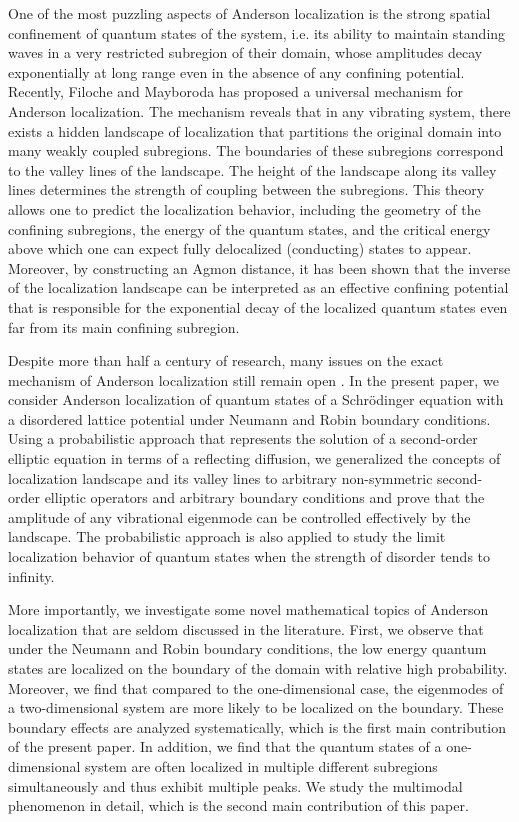\documentclass[a4paper,11pt]{article}
\begin{document}
One of the most puzzling aspects of Anderson localization is the strong spatial confinement of quantum states of the system, i.e. its ability to maintain standing waves in a very restricted subregion of their domain, whose amplitudes decay exponentially at long range even in the absence of any confining potential. Recently, Filoche and Mayboroda \cite{filoche2012universal} has proposed a universal mechanism for Anderson localization. The mechanism reveals that in any vibrating system, there exists a hidden landscape of localization that partitions the original domain into many weakly coupled subregions. The boundaries of these subregions correspond to the valley lines of the landscape. The height of the landscape along its valley lines determines the strength of coupling between the subregions. This theory allows one to predict the localization behavior, including the geometry of the confining subregions, the energy of the quantum states, and the critical energy above which one can expect fully delocalized (conducting) states to appear. Moreover, by constructing an Agmon distance, it has been shown \cite{arnold2016effective, arnold2019localization, arnold2019computing} that the inverse of the localization landscape can be interpreted as an effective confining potential that is responsible for the exponential decay of the localized quantum states even far from its main confining subregion.

Despite more than half a century of research, many issues on the exact mechanism of Anderson localization still remain open \cite{abrahams2001metallic, evers2008anderson, lagendijk2009fifty}. In the present paper, we consider Anderson localization of quantum states of a Schr\"{o}dinger equation with a disordered lattice potential under Neumann and Robin boundary conditions. Using a probabilistic approach that represents the solution of a second-order elliptic equation in terms of a reflecting diffusion, we generalized the concepts of localization landscape and its valley lines to arbitrary non-symmetric second-order elliptic operators and arbitrary boundary conditions and prove that the amplitude of any vibrational eigenmode can be controlled effectively by the landscape. The probabilistic approach is also applied to study the limit localization behavior of quantum states when the strength of disorder tends to infinity.

More importantly, we investigate some novel mathematical topics of Anderson localization that are seldom discussed in the literature. First, we observe that under the Neumann and Robin boundary conditions, the low energy quantum states are localized on the boundary of the domain with relative high probability. Moreover, we find that compared to the one-dimensional case, the eigenmodes of a two-dimensional system are more likely to be localized on the boundary. These boundary effects are analyzed systematically, which is the first main contribution of the present paper. In addition, we find that the quantum states of a one-dimensional system are often localized in multiple different subregions simultaneously and thus exhibit multiple peaks. We study the multimodal phenomenon in detail, which is the second main contribution of this paper.
\end{document}
